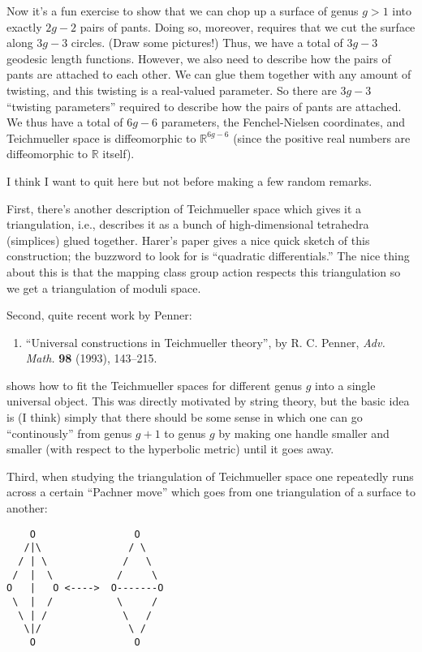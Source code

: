 \documentclass{article}
\def\tightlist{}
\begin{document}
Now it's a fun exercise to show that we can chop up a surface of genus
\(g > 1\) into exactly \(2g - 2\) pairs of pants. Doing so, moreover,
requires that we cut the surface along \(3g - 3\) circles. (Draw some
pictures!) Thus, we have a total of \(3g - 3\) geodesic length
functions. However, we also need to describe how the pairs of pants are
attached to each other. We can glue them together with any amount of
twisting, and this twisting is a real-valued parameter. So there are
\(3g - 3\) ``twisting parameters'' required to describe how the pairs of
pants are attached. We thus have a total of \(6g - 6\) parameters, the
Fenchel-Nielsen coordinates, and Teichmueller space is diffeomorphic to
\(\mathbb{R}^{6g - 6}\) (since the positive real numbers are
diffeomorphic to \(\mathbb{R}\) itself).

I think I want to quit here but not before making a few random remarks.

First, there's another description of Teichmueller space which gives it
a triangulation, i.e., describes it as a bunch of high-dimensional
tetrahedra (simplices) glued together. Harer's paper gives a nice quick
sketch of this construction; the buzzword to look for is ``quadratic
differentials.'' The nice thing about this is that the mapping class
group action respects this triangulation so we get a triangulation of
moduli space.

Second, quite recent work by Penner:

\begin{enumerate}
\def\labelenumi{\arabic{enumi})}
\setcounter{enumi}{6}
\tightlist
\item
  ``Universal constructions in Teichmueller theory'', by R. C. Penner,
  \emph{Adv. Math.} \textbf{98} (1993), 143--215.
\end{enumerate}

shows how to fit the Teichmueller spaces for different genus \(g\) into
a single universal object. This was directly motivated by string theory,
but the basic idea is (I think) simply that there should be some sense
in which one can go ``continously'' from genus \(g+1\) to genus \(g\) by
making one handle smaller and smaller (with respect to the hyperbolic
metric) until it goes away.

Third, when studying the triangulation of Teichmueller space one
repeatedly runs across a certain ``Pachner move'' which goes from one
triangulation of a surface to another:

\begin{verbatim}
    O                 O
   /|\               / \    
  / | \             /   \  
 /  |  \           /     \ 
O   |   O <---->  O-------O
 \  |  /           \     /   
  \ | /             \   /          
   \|/               \ /     
    O                 O
\end{verbatim}
\end{document}
